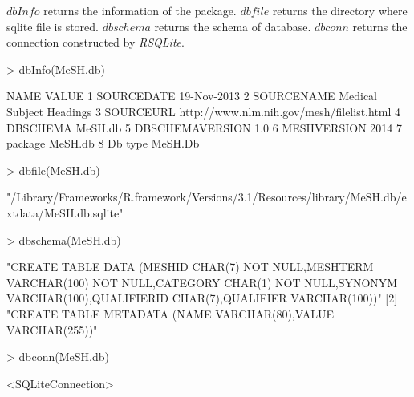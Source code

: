\documentclass[11pt]{article}
\newcommand{\Rpackage}[1]{{\textit{#1}}}
\begin{document}
$dbInfo$ returns the information of the package. $dbfile$ returns the directory where sqlite file is stored. $dbschema$ returns the schema of database. $dbconn$ returns the connection constructed by \Rpackage{RSQLite}.
\begin{center}
\begin{Schunk}
\begin{Sinput}
> dbInfo(MeSH.db)
\end{Sinput}
\begin{Soutput}
             NAME                                     VALUE
1      SOURCEDATE                               19-Nov-2013
2      SOURCENAME                  Medical Subject Headings
3       SOURCEURL http://www.nlm.nih.gov/mesh/filelist.html
4        DBSCHEMA                                   MeSH.db
5 DBSCHEMAVERSION                                       1.0
6     MESHVERSION                                      2014
7         package                                   MeSH.db
8         Db type                                   MeSH.Db
\end{Soutput}
\begin{Sinput}
> dbfile(MeSH.db)
\end{Sinput}
\begin{Soutput}
[1] "/Library/Frameworks/R.framework/Versions/3.1/Resources/library/MeSH.db/extdata/MeSH.db.sqlite"
\end{Soutput}
\begin{Sinput}
> dbschema(MeSH.db)
\end{Sinput}
\begin{Soutput}
[1] "CREATE TABLE DATA (\n  MESHID CHAR(7) NOT NULL,\n  MESHTERM VARCHAR(100) NOT NULL,\n  CATEGORY CHAR(1) NOT NULL,\n  SYNONYM VARCHAR(100),\n  QUALIFIERID CHAR(7),\n  QUALIFIER VARCHAR(100)\n)"
[2] "CREATE TABLE METADATA (\n  NAME VARCHAR(80),\n  VALUE VARCHAR(255)\n)"                                                                                                                         
\end{Soutput}
\begin{Sinput}
> dbconn(MeSH.db)
\end{Sinput}
\begin{Soutput}
<SQLiteConnection>
\end{Soutput}
\end{Schunk}
\end{center}
\end{document}
